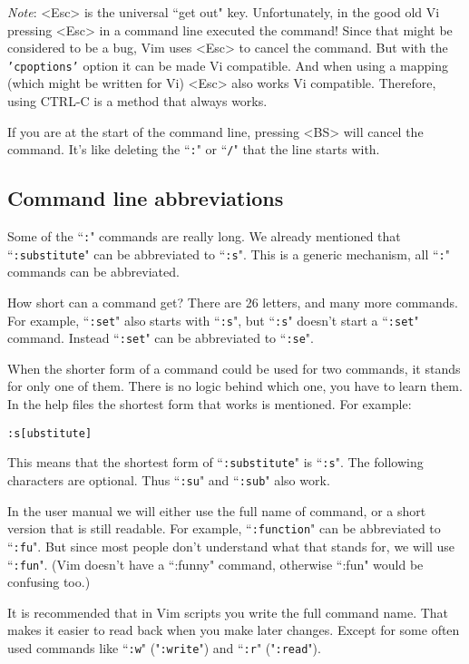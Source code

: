 \emph{Note}:
<Esc> is the universal ``get out" key.
Unfortunately, in the good old Vi pressing <Esc> in a command line executed the command!
Since that might be considered to be a bug, Vim uses <Esc> to cancel the command.
But with the \texttt{'cpoptions'} option it can be made Vi compatible.
And when using a mapping (which might be written for Vi) <Esc> also works Vi compatible.
Therefore, using CTRL-C is a method that always works.

If you are at the start of the command line, pressing <BS> will cancel the command.
It's like deleting the ``\texttt{:}" or ``\texttt{/}" that the line starts with.
\subsection{Command line abbreviations}
Some of the ``\texttt{:}" commands are really long.
We already mentioned that ``\texttt{:substitute}" can be abbreviated to ``\texttt{:s}".
This is a generic mechanism, all ``\texttt{:}" commands can be abbreviated.

How short can a command get?  There are 26 letters, and many more commands.
For example, ``\texttt{:set}" also starts with ``\texttt{:s}", but ``\texttt{:s}" doesn't start a ``\texttt{:set}" command.
Instead ``\texttt{:set}" can be abbreviated to ``\texttt{:se}".

When the shorter form of a command could be used for two commands, it stands for only one of them.
There is no logic behind which one, you have to learn them.
In the help files the shortest form that works is mentioned.
For example:

\begin{Verbatim}[samepage=true]
 :s[ubstitute]
\end{Verbatim}

This means that the shortest form of ``\texttt{:substitute}" is ``\texttt{:s}".
The following characters are optional.
Thus ``\texttt{:su}" and ``\texttt{:sub}" also work.

In the user manual we will either use the full name of command, or a short version that is still readable.
For example, ``\texttt{:function}" can be abbreviated to ``\texttt{:fu}".
But since most people don't understand what that stands for, we will use ``\texttt{:fun}".
(Vim doesn't have a ``:funny" command, otherwise ``:fun" would be confusing too.)

It is recommended that in Vim scripts you write the full command name.
That makes it easier to read back when you make later changes.
Except for some often used commands like ``\texttt{:w}" ("\texttt{:write}") and ``\texttt{:r}" ("\texttt{:read}").


